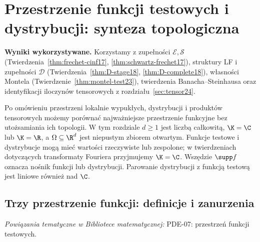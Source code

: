 \setcounter{section}{24}
\section{Przestrzenie funkcji testowych i dystrybucji: synteza topologiczna}
\label{sec:synteza25}

\providecommand{\atlasref}[2]{#2}


\noindent\textbf{Wyniki wykorzystywane.} Korzystamy z zupełności
$\mathcal E,\mathcal S$ (Twierdzenia~\ref{thm:frechet-cinf17},
\ref{thm:schwartz-frechet17}), struktury LF i zupełności $\mathcal D$
(Twierdzenia~\ref{thm:D-stage18}, \ref{thm:D-complete18}),
własności Montela (Twierdzenie~\ref{thm:montel-test23}),
twierdzenia Banacha--Steinhausa oraz identyfikacji iloczynów
tensorowych z rozdziału~\ref{sec:tensor24}.
\par\medskip

Po omówieniu przestrzeni lokalnie wypukłych, dystrybucji i produktów
 tensorowych możemy porównać najważniejsze przestrzenie funkcyjne bez
 utożsamiania ich topologii. W tym rozdziale $d\ge1$ jest liczbą całkowitą, $\K=\C$ lub
 $\K=\R$, a $\Omega\subseteq\R^d$ jest niepustym zbiorem otwartym.
 Funkcje testowe i dystrybucje mogą mieć wartości rzeczywiste lub
 zespolone; w twierdzeniach dotyczących transformaty Fouriera
 przyjmujemy $\K=\C$. Wszędzie $\supp f$ oznacza nośnik funkcji
 lub dystrybucji. Parowanie dystrybucji z funkcją testową
 jest liniowe również nad $\C$.

\subsection{Trzy przestrzenie funkcji: definicje i zanurzenia}

\noindent\emph{Powiązania tematyczne w Bibliotece matematycznej:} \atlasref{PDE-07::def:pde7-test}{PDE-07: przestrzeń funkcji testowych}.


